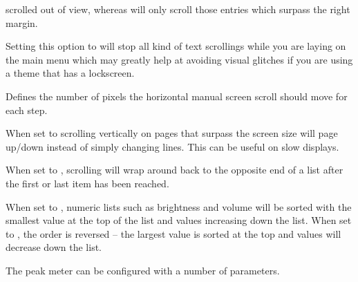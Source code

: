 \begin{description}
\begin{description}
      scrolled out of view, whereas  will only scroll those entries
      which surpass the right margin.
    \item[Disable main menu scrolling]
      Setting this option to 
      will stop all kind of text scrollings while you are laying on the main menu
      which may greatly help at avoiding visual glitches if you are using a theme
      that has a lockscreen.
    \item[Screen Scroll Step Size.]
      Defines the number of pixels the horizontal manual screen scroll should move
      for each step.
    \item[Paged Scrolling.]
      When set to  scrolling vertically on pages that surpass the
      screen size will page up/down instead of simply changing lines. This can be
      useful on slow displays.
    \item[List Wraparound.]
      When set to , scrolling will wrap around back to the opposite
      end of a list after the first or last item has been reached.
    \item[List Order.]
      When set to , numeric lists such as brightness and
      volume will be sorted with the smallest value at the top of the list and
      values increasing down the list. When set to , the
      order is reversed -- the largest value is sorted at the top and values
      will decrease down the list.
    \end{description}
%
  \item[Peak Meter.]
    The peak meter can be configured with a number of parameters.
    \begin{description}

\end{description}
\end{description}
